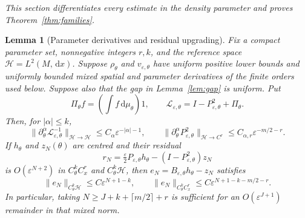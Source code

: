 \documentclass[11pt,a4paper]{article}
\newtheorem{lemma}[theorem]{Lemma}
\theoremstyle{definition}\newtheorem{definition}[theorem]{Definition}
\theoremstyle{remark}\newtheorem{remark}[theorem]{Remark}
\newcommand{\eps}{\varepsilon}
\newcommand{\dd}{\,\mathrm d}
\newcommand{\norm}[1]{\lVert #1\rVert}
\begin{document}
\noindent\emph{This section differentiates every estimate in the density parameter and proves Theorem~\ref{thm:families}.}

\begin{lemma}[Parameter derivatives and residual upgrading]\label{lem:mixed}
Fix a compact parameter set, nonnegative integers $r,k$, and the reference space $\mathcal H=L^2(M,\dd x)$. Suppose $\rho_\theta$ and $v_{\eps,\theta}$ have uniform positive lower bounds and uniformly bounded mixed spatial and parameter derivatives of the finite orders used below. Suppose also that the gap in Lemma~\ref{lem:gap} is uniform. Put
\[
\Pi_\theta f=\left(\int f\dd\mu_\theta\right)1,
\qquad \mathcal L_{\eps,\theta}=I-P_{\eps,\theta}^2+\Pi_\theta.
\]
Then, for $|\alpha|\leq k$,
\begin{equation}\label{eq:mixedbounds}
\norm{\partial_\theta^\alpha\mathcal L_{\eps,\theta}^{-1}}_{\mathcal H\to\mathcal H}
\leq C_\alpha\eps^{-|\alpha|-1},\qquad
\norm{\partial_\theta^\alpha P_{\eps,\theta}^2}_{\mathcal H\to C^r}
\leq C_{\alpha,r}\eps^{-m/2-r}.
\end{equation}
If $h_\theta$ and $z_N(\theta)$ are centred and their residual
\[
r_N=\tfrac\eps2P_{\eps,\theta}h_\theta
-(I-P_{\eps,\theta}^2)z_N
\]
is $O(\eps^{N+2})$ in $C_\theta^k C_x^r$ and $C_\theta^k\mathcal H$, then $e_N=B_{\eps,\theta}h_\theta-z_N$ satisfies
\begin{equation}\label{eq:mixederror}
\norm{e_N}_{C_\theta^k\mathcal H}\leq C\eps^{N+1-k},\qquad
\norm{e_N}_{C_\theta^k C_x^r}\leq C\eps^{N+1-k-m/2-r}.
\end{equation}
In particular, taking $N\geq J+k+\lceil m/2\rceil+r$ is sufficient for an $O(\eps^{J+1})$ remainder in that mixed norm.
\end{lemma}
\end{document}
